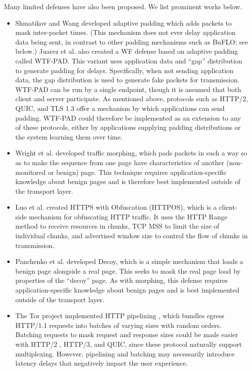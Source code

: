 \documentclass[runningheads]{llncs}
\begin{document}
Many limited defenses have also been proposed. We list prominent works below.
%
\begin{itemize}
\item Shmatikov and Wang \cite{shmatikov2006timing} developed adaptive padding which adds packets to mask
inter-packet times. (This mechanism does not ever delay application data being sent, in contrast to other
padding mechanisms such as BuFLO; see below.)
Juarez et al. \cite{juarez2015wtf,juarez2016toward} also created a WF defense based on adaptive padding called WTF-PAD.
This variant uses application data and ``gap'' distribution to generate padding for delays. Specifically, when
not sending application data, the gap distribution is used to generate fake packets for transmission.
WTF-PAD can be run by a single endpoint, though it is assumed that both client and server participate.
As mentioned above, protocols such as HTTP/2, QUIC, and TLS 1.3 offer a mechanism by which applications can
send padding. WTF-PAD could therefore be implemented as an extension to any of these protocols, either by
applications supplying padding distributions or the system learning them over time.

\item Wright et al. \cite{wright2009traffic} developed traffic morphing, which pads packets in such a way
so as to make the sequence from one page have characteristics of another (non-monitored or benign) page.
This technique requires application-specific knowledge about benign pages and is therefore best implemented
outside of the transport layer.

\item Luo et al. \cite{luo2011httpos} created HTTPS with Obfuscation (HTTPOS), which is a client-side
mechanism for obfuscating HTTP traffic. It uses the HTTP Range method to receive resources in chunks, TCP
MSS to limit the size of individual chunks, and advertised window size to control the flow of chunks
in transmission.

\item Panchenko et al. \cite{panchenko2011website} developed Decoy, which is a simple mechanism that loads
a benign page alongside a real page. This seeks to mask the real page load by properties of the ``decoy'' page.
As with morphing, this defense requires application-specific knowledge about benign pages and is best
implemented outside of the transport layer.

\item The Tor project implemented HTTP pipelining \cite{perry2011experimental}, which bundles egress HTTP/1.1
requests into batches of varying sizes with random orders. Batching requests to mask request and response sizes
could be made easier with HTTP/2 \cite{rfc7540}, HTTP/3, and QUIC, since these protocol naturally support
multiplexing. However, pipelining and batching may necessarily introduce latency delays that negatively impact
the user experience.


\end{itemize}
\end{document}
